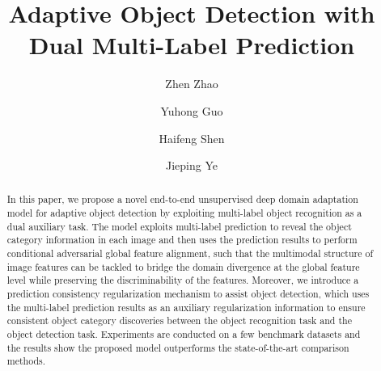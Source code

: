 \documentclass[runningheads]{llncs}
\begin{document}
\pagestyle{headings}
\mainmatter

\title{Adaptive Object Detection with Dual Multi-Label Prediction }


\begin{comment}
\titlerunning{ECCV-20 submission ID \ECCVSubNumber} 
\authorrunning{ECCV-20 submission ID \ECCVSubNumber} 
\author{Anonymous ECCV submission}
\institute{Paper ID \ECCVSubNumber}
\end{comment}


\author{Zhen Zhao \and
Yuhong Guo \and
Haifeng Shen \and
Jieping Ye 
}
\maketitle

\begin{abstract}

In this paper, we propose a novel end-to-end unsupervised deep domain adaptation model 
for adaptive object detection
by exploiting multi-label object recognition as a dual auxiliary task.
The model exploits multi-label prediction to reveal the object category information in each image
and then uses the prediction results to perform
conditional adversarial global feature alignment,
such that the multimodal structure of
image features can be tackled to 
bridge the domain divergence at the global feature level
while preserving the discriminability of the features. 
Moreover, 
we introduce a prediction consistency regularization mechanism to assist object detection, 
which uses the multi-label prediction results as an auxiliary regularization information
to ensure consistent object category discoveries between 
the object recognition task and the object detection task.
Experiments are conducted on a few benchmark datasets 
	and the results show the proposed model outperforms
the state-of-the-art comparison methods.
\end{abstract}
\end{document}
